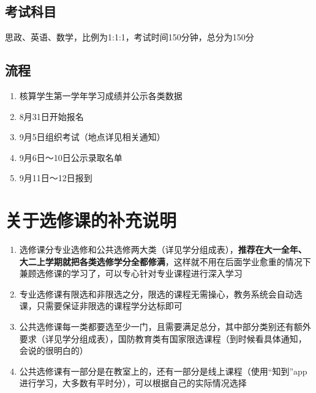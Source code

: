 \subsection[考试科目]{考试科目}
思政、英语\footnotemark、数学，比例为1:1:1，考试时间150分钟，总分为150分

\subsection[流程]{流程}
\begin{enumerate}
    \item 核算学生第一学年学习成绩并公示各类数据
    \item 8月31日开始报名
    \item 9月5日组织考试（地点详见相关通知）
    \item 9月6日～10日公示录取名单\footnotemark
    \item 9月11日～12日报到
\end{enumerate}

\section[关于选修课的补充说明]{关于选修课的补充说明}
\begin{enumerate}
    \item 选修课分专业选修和公共选修两大类（详见学分组成表），\textbf{推荐在大一全年、大二上学期就把各类选修学分全都修满}，这样就不用在后面学业愈重的情况下兼顾选修课的学习了，可以专心针对专业课程进行深入学习
    \item 专业选修课有限选和非限选之分，限选的课程无需操心，教务系统会自动选课，只需要保证非限选的课程学分达标即可
    \item 公共选修课每一类都要选至少一门，且需要满足总分，其中部分类别还有额外要求（详见学分组成表），国防教育类有国家限选课程（到时候看具体通知，会说的很明白的）
    \item 公共选修课有一部分是在教室上的，还有一部分是线上课程（使用“知到”app进行学习，大多数有平时分），可以根据自己的实际情况选择
\end{enumerate}

